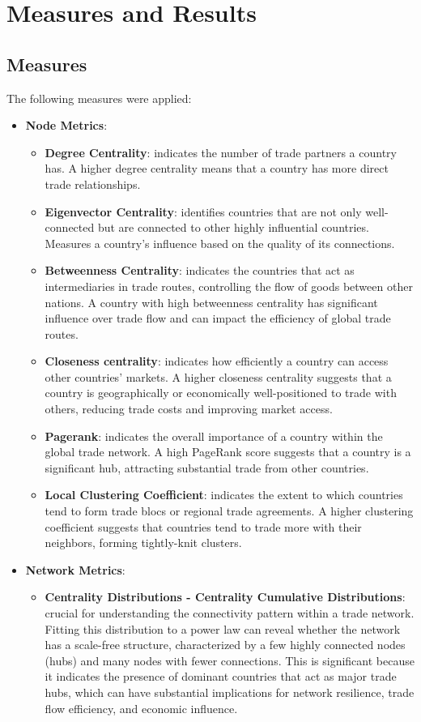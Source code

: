 \documentclass[12pt, a4paper]{article}
\begin{document}
\section{Measures and Results}
\label{measures}
\subsection{Measures}

The following measures were applied:
\begin{itemize}
\item \textbf{Node Metrics}:
\begin{itemize}
    \item \textbf{Degree Centrality}: indicates the number of trade partners a country has. A higher degree centrality means that a country has more direct trade relationships.
    \item \textbf{Eigenvector Centrality}: identifies countries that are not only well-connected but are connected to other highly influential countries.  Measures a country's influence based on the quality of its connections.
    \item \textbf{Betweenness Centrality}: indicates the countries that act as intermediaries in trade routes, controlling the flow of goods between other nations. A country with high betweenness centrality has significant influence over trade flow and can impact the efficiency of global trade routes.
    \item \textbf{Closeness centrality}: indicates how efficiently a country can access other countries' markets. A higher closeness centrality suggests that a country is geographically or economically well-positioned to trade with others, reducing trade costs and improving market access.
    \item \textbf{Pagerank}: indicates the overall importance of a country within the global trade network. A high PageRank score suggests that a country is a significant hub, attracting substantial trade from other countries.
    \item \textbf{Local Clustering Coefficient}: indicates the extent to which countries tend to form trade blocs or regional trade agreements. A higher clustering coefficient suggests that countries tend to trade more with their neighbors, forming tightly-knit clusters.
\end{itemize}
\item \textbf{Network Metrics}:
\begin{itemize}
    \item \textbf{Centrality Distributions - Centrality Cumulative Distributions}: crucial for understanding the connectivity pattern within a trade network. Fitting this distribution to a power law can reveal whether the network has a scale-free structure, characterized by a few highly connected nodes (hubs) and many nodes with fewer connections. This is significant because it indicates the presence of dominant countries that act as major trade hubs, which can have substantial implications for network resilience, trade flow efficiency, and economic influence.

\end{itemize}
\end{itemize}
\end{document}
